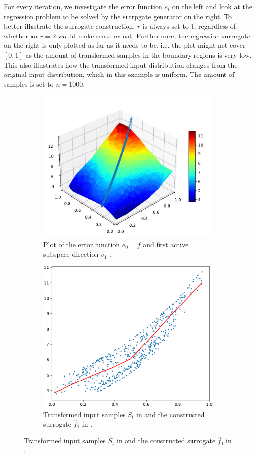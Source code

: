 \documentclass[
  a4paper,  %
  twoside,  %
  bibliography=totoc,
  headsepline,
  cleardoublepage=empty,
  parskip=half,
  draft=false
]{scrbook}
\begin{document}
For every iteration, we investigate the error function $e_i$ on the left and look at the regression problem to be solved by the surrpgate generator on the right.
To better illustrate the surrogate construction, $r$ is always set to $1$, regardless of whether an $r=2$ would make sense or not.
Furthermore, the regression surrogate on the right is only plotted as far as it needs to be, i.e. the plot might not cover $[0,1]$ as the amount of transformed samples in the boundary regions is very low.
This also illustrates how the transformed input distribution changes from the original input distribution, which in this example is uniform.
The amount of samples is set to $n=1000$.

\newpage
\begin{mdframed}[style=style]
\begin{figure}[H]
\begin{subfigure}{.5\textwidth}
  \centering
  \includegraphics[width=.8\linewidth]{graphics/pipeline_current_1}
  \caption{Plot of the error function $e_0=f$ and first active subspace direction $v_1$ \darkblue.}
\label{fig:pipeline_current_1}
\end{subfigure}%
\begin{subfigure}{.5\textwidth}
  \centering
  \includegraphics[width=.7\linewidth]{graphics/pipeline_local_1}
  \caption{Transformed input samples $S_t$ in \darkblue and the constructed surrogate $\hat{f}_1$ in \red.}
\label{fig:pipeline_local_1}
\end{subfigure}
\delimit
{}
\label{fig:pipeline_1}
\end{figure}
\end{mdframed}
\end{document}
